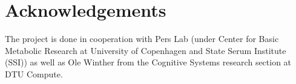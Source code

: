 \section{Acknowledgements}
\label{sec:acknowledgements}

The project is done in cooperation with Pers Lab (under Center for Basic Metabolic Research at University of Copenhagen and State Serum Institute (SSI)) as well as Ole Winther from the Cognitive Systems research section at DTU Compute.
